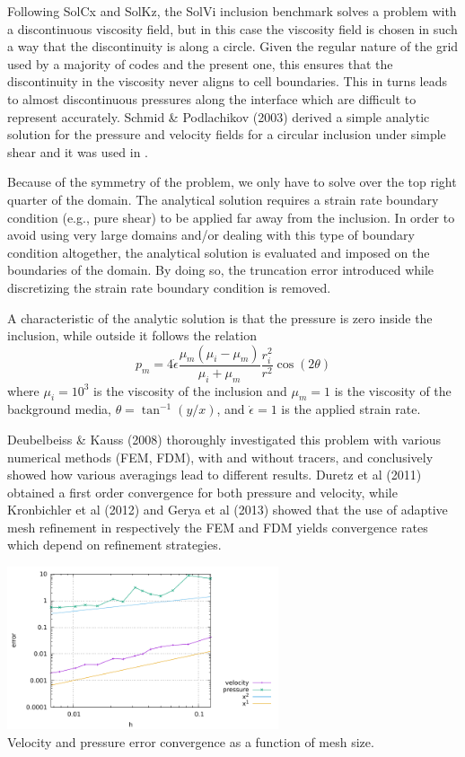 
Following SolCx and SolKz, the SolVi inclusion benchmark solves 
a problem with a discontinuous viscosity field, but in this case 
the viscosity field is chosen in such a way that the discontinuity 
is along a circle. Given the regular nature of the grid used by a majority of codes and the present one, 
this ensures that the discontinuity in the viscosity never aligns to cell boundaries.
This in turns leads to almost discontinuous pressures along the interface which are difficult to represent accurately.
Schmid \& Podlachikov (2003) \cite{scpo03} derived a simple analytic solution for the pressure and 
velocity fields for a circular 
inclusion under simple shear and it was used in \cite{deka08,sunh10,dumg11,krhb12,gemd13}.

Because of the symmetry of the problem, we only have to solve over the top right quarter of the domain.
The analytical solution requires a strain rate boundary condition (e.g., pure shear) to be applied far away 
from the inclusion. In order to avoid using very large domains and/or dealing with this type of boundary condition 
altogether, the analytical solution is evaluated and imposed on the boundaries of the domain. 
By doing so, the truncation error introduced while discretizing the strain rate boundary condition is removed.

A characteristic of the analytic solution is that the pressure is zero inside the inclusion, while outside it follows the relation
\begin{equation}
p_m = 4 \dot{\epsilon}
\frac{\mu_m(\mu_i-\mu_m)}{\mu_i+\mu_m}
\frac{r_i^2}{r^2} \cos(2\theta)
\end{equation}
where $\mu_i = 10^3$ is the viscosity of the inclusion and $\mu_m = 1$ is the viscosity of the background media, $\theta=\tan^{-1}(y/x)$,
and $\dot{\epsilon}=1$ is the applied strain rate.

Deubelbeiss \& Kauss (2008) \cite{deka08} thoroughly investigated this problem with various 
numerical methods (FEM, FDM), with and without tracers, 
and conclusively showed how various averagings lead to different results. 
Duretz et al (2011) \cite{dumg11} obtained a first order convergence for both pressure and velocity, 
while Kronbichler et al (2012) \cite{krhb12}
and Gerya et al (2013) \cite{gemd13} showed that the use of adaptive mesh refinement in respectively the FEM and FDM 
yields convergence rates which depend on refinement strategies. 

\begin{center}
\includegraphics[width=8cm]{python_codes/fieldstone_07/results/errors}\\
{\captionfont Velocity and pressure error convergence as a function of mesh size.}
\end{center}

